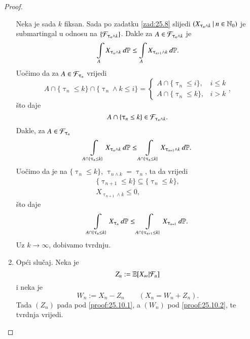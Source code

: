 \begin{proof}
\begin{enumerate}[label=(\alph*)]
        Neka je sada $k$ fiksan.
        Sada po zadatku \ref{zad:25.8} slijedi
        $({X_{\uptau_n \land k}} \: | \: {n \in \mathbb{N}_0})$ je submartingal u odnosu na $\{ \mathcal{F}_{\uptau_n \land k} \}$.
        Dakle za $A \in \mathcal{F}_{\uptau_n \land k}$ je
        \begin{equation*}
            \int\limits_A X_{\uptau_n \land k} \: d \mathbb{P} \leq \int\limits_A X_{\uptau_{n + 1} \land k} \: d \mathbb{P}.
        \end{equation*}
        Uo\v cimo da za $A \in \mathcal{F}_{\uptau_n}$ vrijedi
        \begin{equation*}
            A \cap \{ \uptau_n \leq k \} \cap \{ \uptau_n \land k \leq i \} =
            \begin{cases}
                A \cap \{ \uptau_n \leq i \} ,& i \leq k\\
                A \cap \{ \uptau_n \leq k \} ,& i > k
            \end{cases},
        \end{equation*}
        \v sto daje
        \begin{equation*}
            A \cap \{ \uptau_n \leq k \} \in \mathcal{F}_{\uptau_n \land k}.
        \end{equation*}
        Dakle, za $A \in \mathcal{F}_{\uptau_n}$
        \begin{equation*}
            \int\limits_{A \cap \{ \uptau_n \leq k \}} X_{\uptau_n \land k} \: d \mathbb{P} \leq \int\limits_{A \cap \{ \uptau_n \leq k \}} X_{\uptau_{n + 1} \land k} \: d \mathbb{P}.
        \end{equation*}
        Uo\v cimo da je na $\{ \uptau_n \leq k \}$, $\uptau_{n \land k} = \uptau_n$, ta da vrijedi
        \begin{equation*}
            \begin{gathered}
                \{ \uptau_{n + 1} \leq k \} \subseteq \{ \uptau_n \leq k \},\\
                X_{\uptau_{n + 1} \land k} \leq 0,
            \end{gathered}
        \end{equation*}
        \v sto daje
        \begin{equation*}
            \int\limits_{A \cap \{ \uptau_n \leq k \}} X_{\uptau_n} \: d \mathbb{P} \leq \int\limits_{A \cap \{ \uptau_{n + 1} \leq k \}} X_{\uptau_{n + 1}} \: d \mathbb{P}.
        \end{equation*}
        Uz $k \to \infty$, dobivamo tvrdnju.
        \item   \label{proof:25.10.3}
        Op\' ci slu\v caj.
        Neka je
        \begin{equation*}
            Z_n := \mathbb{E} [X_\infty | \mathcal{F}_n]
        \end{equation*}
        i neka je
        \begin{equation*}
            W_n := X_n - Z_n \quad \quad (X_n = W_n + Z_n).
        \end{equation*}
        Tada $(Z_n)$ pada pod \ref{proof:25.10.1}, a $(W_n)$ pod \ref{proof:25.10.2}, te tvrdnja vrijedi.
    \end{enumerate}
\end{proof}

